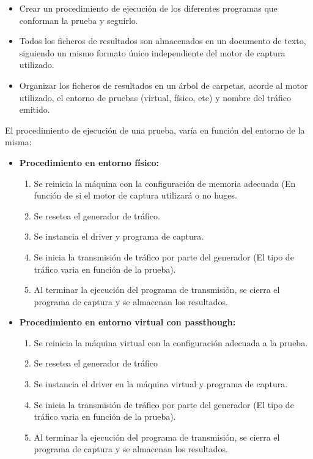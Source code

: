 \begin{itemize}
\item Crear un procedimiento de ejecución de los diferentes programas que conforman la prueba y seguirlo.
\item Todos los ficheros de resultados son almacenados en un documento de texto, siguiendo un mismo formato único independiente del motor de captura utilizado.
\item Organizar los ficheros de resultados en un árbol de carpetas, acorde al motor utilizado, el entorno de pruebas (virtual, físico, etc) y nombre del tráfico emitido.
\end{itemize}

El procedimiento de ejecución de una prueba, varía en función del entorno de la misma:

\begin{itemize}
\item \textbf{Procedimiento en entorno físico:}
\begin{enumerate}
\item Se reinicia la máquina con la configuración de memoria adecuada (En función de si el motor de captura utilizará o no \glspl{huge}.
\item Se resetea el generador de tráfico.
\item Se instancia el driver y programa de captura.
\item Se inicia la transmisión de tráfico por parte del generador (El tipo de tráfico varia en función de la prueba).
\item Al terminar la ejecución del programa de transmisión, se cierra el programa de captura y se almacenan los resultados.
\end{enumerate}

\item \textbf{Procedimiento en entorno virtual con \gls{passthough}:}
\begin{enumerate}
\item Se reinicia la máquina virtual con la configuración adecuada a la prueba.
\item Se resetea el generador de tráfico
\item Se instancia el driver en la máquina virtual y programa de captura.
\item Se inicia la transmisión de tráfico por parte del generador (El tipo de tráfico varia en función de la prueba).
\item Al terminar la ejecución del programa de transmisión, se cierra el programa de captura y se almacenan los resultados.
\end{enumerate}


\end{itemize}
